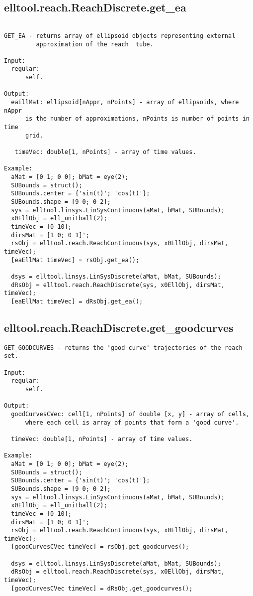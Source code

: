 \subsection{\texorpdfstring{elltool.reach.ReachDiscrete.get\_ea}{get\_ea}}\label{method:elltool.reach.ReachDiscrete.getea}
\begin{verbatim}

GET_EA - returns array of ellipsoid objects representing external
         approximation of the reach  tube.

Input:
  regular:
      self.

Output:
  eaEllMat: ellipsoid[nAppr, nPoints] - array of ellipsoids, where nAppr
      is the number of approximations, nPoints is number of points in time
      grid.

   timeVec: double[1, nPoints] - array of time values.

Example:
  aMat = [0 1; 0 0]; bMat = eye(2);
  SUBounds = struct();
  SUBounds.center = {'sin(t)'; 'cos(t)'};
  SUBounds.shape = [9 0; 0 2];
  sys = elltool.linsys.LinSysContinuous(aMat, bMat, SUBounds);
  x0EllObj = ell_unitball(2);
  timeVec = [0 10];
  dirsMat = [1 0; 0 1]';
  rsObj = elltool.reach.ReachContinuous(sys, x0EllObj, dirsMat, timeVec);
  [eaEllMat timeVec] = rsObj.get_ea();

  dsys = elltool.linsys.LinSysDiscrete(aMat, bMat, SUBounds);
  dRsObj = elltool.reach.ReachDiscrete(sys, x0EllObj, dirsMat, timeVec);
  [eaEllMat timeVec] = dRsObj.get_ea();
\end{verbatim}
\subsection{\texorpdfstring{elltool.reach.ReachDiscrete.get\_goodcurves}{get\_goodcurves}}\label{method:elltool.reach.ReachDiscrete.getgoodcurves}
\begin{verbatim}
GET_GOODCURVES - returns the 'good curve' trajectories of the reach set.

Input:
  regular:
      self.

Output:
  goodCurvesCVec: cell[1, nPoints] of double [x, y] - array of cells,
      where each cell is array of points that form a 'good curve'.

  timeVec: double[1, nPoints] - array of time values.

Example:
  aMat = [0 1; 0 0]; bMat = eye(2);
  SUBounds = struct();
  SUBounds.center = {'sin(t)'; 'cos(t)'};
  SUBounds.shape = [9 0; 0 2];
  sys = elltool.linsys.LinSysContinuous(aMat, bMat, SUBounds);
  x0EllObj = ell_unitball(2);
  timeVec = [0 10];
  dirsMat = [1 0; 0 1]';
  rsObj = elltool.reach.ReachContinuous(sys, x0EllObj, dirsMat, timeVec);
  [goodCurvesCVec timeVec] = rsObj.get_goodcurves();

  dsys = elltool.linsys.LinSysDiscrete(aMat, bMat, SUBounds);
  dRsObj = elltool.reach.ReachDiscrete(sys, x0EllObj, dirsMat, timeVec);
  [goodCurvesCVec timeVec] = dRsObj.get_goodcurves();
\end{verbatim}
